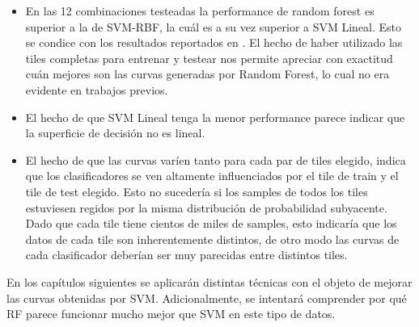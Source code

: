 \begin{itemize}

\item En las 12 combinaciones testeadas la performance de random forest es superior a la de SVM-RBF, la cuál es a su vez superior a SVM Lineal. Esto se condice con los resultados reportados en \cite{jbc}. El hecho de haber utilizado las tiles completas para entrenar y testear nos permite apreciar con exactitud cuán mejores son las curvas generadas por Random Forest, lo cual no era evidente en trabajos previos.

\item El hecho de que SVM Lineal tenga la menor performance parece indicar que la superficie de decisión no es lineal.
\item El hecho de que las curvas varíen tanto para cada par de tiles elegido, indica que los clasificadores se ven altamente influenciados por el tile de train y el tile de test elegido. Esto no sucedería si los samples de todos los tiles estuviesen regidos por la misma distribución de probabilidad subyacente. Dado que cada tile tiene cientos de miles de samples, esto indicaría que los datos de cada tile son inherentemente distintos, de otro modo las curvas de cada clasificador deberían ser muy parecidas entre distintos tiles.
\end{itemize}

En los capítulos siguientes se aplicarán distintas técnicas con el objeto de mejorar las curvas obtenidas por SVM. Adicionalmente, se intentará comprender por qué RF parece funcionar mucho mejor que SVM en este tipo de datos.
